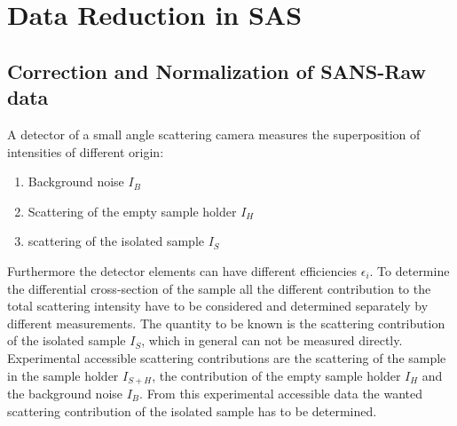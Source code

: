 \chapter{Data Reduction in SAS}
\label{ch:SASdatacorrection}
\section{Correction and Normalization of SANS-Raw data}

A detector of a small angle scattering camera measures the
superposition of intensities of different origin:
\begin{enumerate}
\item Background noise $I_B$
\item Scattering of the empty sample holder $I_{H}$
\item scattering of the isolated sample $I_S$
\end{enumerate}
Furthermore the detector elements can have different efficiencies $\epsilon_i$.
To determine the differential cross-section of the sample all the different
contribution to the total scattering intensity have to be considered and determined
separately by different measurements. The quantity to be known is the scattering
contribution of the isolated sample $I_S$, which in general can not be measured directly.
Experimental accessible scattering contributions are the scattering of the sample in the
sample holder $I_{S+H}$, the contribution of the empty sample holder $I_{H}$ and the
background noise $I_B$. From this experimental accessible data the wanted scattering
contribution of the isolated sample has to be determined.

